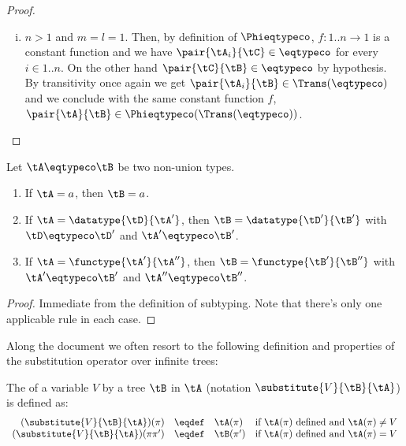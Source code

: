 \begin{proof}
\begin{itemize}
\begin{enumerate}
\begin{enumerate}[(i)]
      \item $n > 1$ and $m = l = 1$. Then, by definition of $\Phieqtypeco$,
      $f : 1..n \to 1$ is a constant function and we have $\pair{\tA_i}{\tC}
      \in \mathbin{\eqtypeco}$ for every $i \in 1..n$. On the other hand
      $\pair{\tC}{\tB} \in \mathbin{\eqtypeco}$ by hypothesis. By transitivity
      once again we get $\pair{\tA_i}{\tB} \in \Trans\!\left(\eqtypeco\right)$
      and we conclude with the same constant function $f$, $\pair{\tA}{\tB} \in
      \Phieqtypeco\!\left(\Trans(\eqtypeco)\right)$.
    \end{enumerate}
  \end{enumerate}
\end{itemize}
\end{proof}



\begin{lemma}
\label{lem:equalityIsInvertible}
Let $\tA \eqtypeco \tB$ be two non-union types.
\begin{enumerate}
  \item If $\tA = a$, then $\tB = a$.
  \item If $\tA = \datatype{\tD}{\tA'}$, then $\tB = \datatype{\tD'}{\tB'}$
  with $\tD \eqtypeco \tD'$ and $\tA' \eqtypeco \tB'$.
  \item If $\tA = \functype{\tA'}{\tA''}$, then $\tB = \functype{\tB'}{\tB''}$
  with $\tA' \eqtypeco \tB'$ and $\tA'' \eqtypeco \tB''$.
\end{enumerate}
\end{lemma}

\begin{proof}
Immediate from the definition of subtyping. Note that there's only one
applicable rule in each case.
\end{proof}


Along the document we often resort to the following definition and properties
of the substitution operator over infinite trees:

\begin{definition}
\label{def:treeSubstitution}
The  of a variable $V$ by a tree $\tB$ in $\tA$ (notation
$\substitute{V}{\tB}{\tA}$) is defined as: $$
\begin{array}{r@{\quad \eqdef\quad}l@{\quad}l}
(\substitute{V}{\tB}{\tA})(\pi)     & \tA(\pi)  & \text{if $\tA(\pi)$ defined and $\tA(\pi) \neq V$} \\
(\substitute{V}{\tB}{\tA})(\pi\pi') & \tB(\pi') & \text{if $\tA(\pi)$ defined and $\tA(\pi) = V$}
\end{array} $$
\end{definition}



